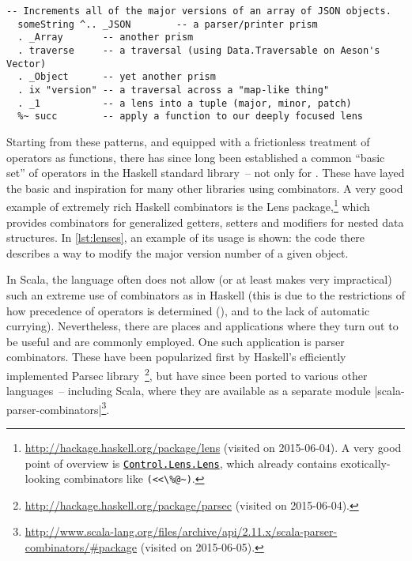 \begin{lstlisting}[style=floating, label=lst:lenses, language={[Modern]Haskell},
  caption={Usage example of lenses, a popular pattern for purely functional structural
    traversal/modification in Haskell, which utilizes an extreme variety of combinators. The
    \lstinline|(.)| operator is nothing more than regular function composition; using it, various lenses
    are combined to \enquote{focus} on the part of interest, on which then the function \lstinline|succ|
    is applied.\protect\footnotemark}]
  -- Increments all of the major versions of an array of JSON objects.
  someString ^.. _JSON        -- a parser/printer prism
  . _Array       -- another prism
  . traverse     -- a traversal (using Data.Traversable on Aeson's Vector)
  . _Object      -- yet another prism
  . ix "version" -- a traversal across a "map-like thing"
  . _1           -- a lens into a tuple (major, minor, patch)
  %~ succ        -- apply a function to our deeply focused lens
\end{lstlisting}

Starting from these patterns, and equipped with a frictionless treatment of operators as functions,
there has since long been established a common \enquote{basic set} of operators in the Haskell
standard library~-- not only for \dsls{}. These have layed the basic and inspiration for many other
libraries using combinators. %
%
A very good example of extremely rich Haskell combinators is the Lens
package,\footnote{\protect\url{http://hackage.haskell.org/package/lens} (visited on 2015-06-04). A
  very good point of overview is
  \protect\href{http://hackage.haskell.org/package/lens-4.11/docs/Control-Lens-Lens.html}{\textcolor{black}{\lstinline[columns=fixed]|Control.Lens.Lens|}},
  which already contains exotically-looking combinators like
  \lstinline[keywordstyle=\color{black}]|(<<\%@~)|.} which provides combinators for generalized
getters, setters and modifiers for nested data structures. In \autoref{lst:lenses}, an example of
its usage is shown: the code there describes a way to modify the major version number of a given
 object.

In Scala, the language often does not allow (or at least makes very impractical) such an extreme use
of combinators as in Haskell (this is due to the restrictions of how precedence of operators is
determined (\cf {}), and to the lack of automatic currying). Nevertheless,
there are places and applications where they turn out to be useful and are commonly employed. One
such application is parser combinators. These have been popularized first by Haskell's efficiently
implemented Parsec
library~\cite{leijen2001:parsec}\footnote{\protect\url{http://hackage.haskell.org/package/parsec}
  (visited on 2015-06-04).}, but have since been ported to various other languages~-- including
Scala, where they are available as a separate module
|scala-parser-combinators|\footnote{\protect\url{http://www.scala-lang.org/files/archive/api/2.11.x/scala-parser-combinators/\#package}
  (visited on 2015-06-05).}.

